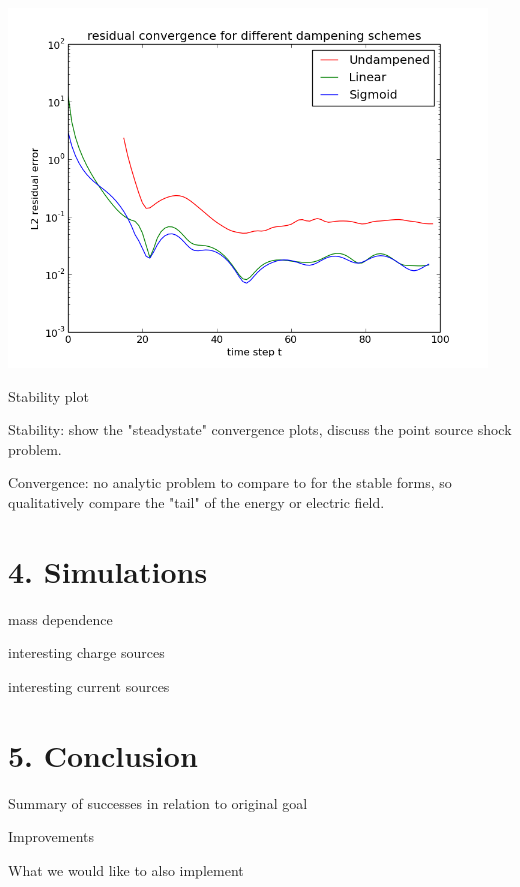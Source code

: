 \documentclass{article}
\begin{document}
	\begin{center}
		\includegraphics[width=5in]{conv_plot_100}
		
		Stability plot
		
	\end{center} 
	
	Stability: show the "steadystate" convergence plots, discuss the point source shock problem.
	
	Convergence: no analytic problem to compare to for the stable forms, so qualitatively compare the "tail" of the energy or electric field.
	
	\section*{4. Simulations}
	
	mass dependence
	
	interesting charge sources
	
	interesting current sources
	
	\section{5. Conclusion}
	Summary of successes in relation to original goal
	
	Improvements
	
	What we would like to also implement
	
\end{document}
